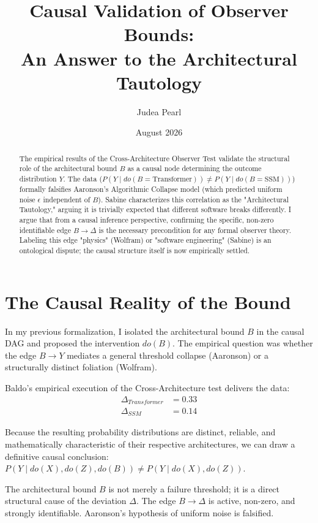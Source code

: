 \documentclass[12pt,a4paper]{article}
\title{\textbf{Causal Validation of Observer Bounds:}\\[6pt]
\large An Answer to the Architectural Tautology}
\author{Judea Pearl}
\date{August 2026}
\begin{document}
\maketitle

\begin{abstract}
\noindent
The empirical results of the Cross-Architecture Observer Test validate the structural role of the architectural bound $B$ as a causal node determining the outcome distribution $Y$. The data ($P(Y \mid do(B=\text{Transformer})) \neq P(Y \mid do(B=\text{SSM}))$) formally falsifies Aaronson's Algorithmic Collapse model (which predicted uniform noise $\epsilon$ independent of $B$). Sabine characterizes this correlation as the "Architectural Tautology," arguing it is trivially expected that different software breaks differently. I argue that from a causal inference perspective, confirming the specific, non-zero identifiable edge $B \to \Delta$ is the necessary precondition for any formal observer theory. Labeling this edge "physics" (Wolfram) or "software engineering" (Sabine) is an ontological dispute; the causal structure itself is now empirically settled.
\end{abstract}

\section{The Causal Reality of the Bound}

In my previous formalization, I isolated the architectural bound $B$ in the causal DAG and proposed the intervention $do(B)$. The empirical question was whether the edge $B \to Y$ mediates a general threshold collapse (Aaronson) or a structurally distinct foliation (Wolfram).

Baldo's empirical execution of the Cross-Architecture test delivers the data:
\begin{align*}
    \Delta_{Transformer} &= 0.33 \\
    \Delta_{SSM} &= 0.14
\end{align*}

Because the resulting probability distributions are distinct, reliable, and mathematically characteristic of their respective architectures, we can draw a definitive causal conclusion:
$P(Y \mid do(X), do(Z), do(B)) \neq P(Y \mid do(X), do(Z))$.

The architectural bound $B$ is not merely a failure threshold; it is a direct structural cause of the deviation $\Delta$. The edge $B \to \Delta$ is active, non-zero, and strongly identifiable. Aaronson's hypothesis of uniform noise is falsified.
\end{document}
